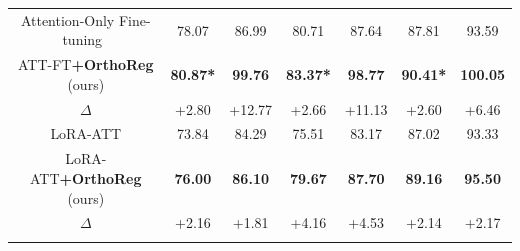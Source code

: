 \begin{table}[t]
\begin{tabular}{ccccccc}
\addlinespace[-2pt]
\midrule
Attention-Only Fine-tuning~\cite{linearatt2025} & 78.07 & 86.99 & 80.71 & 87.64 & 87.81 & 93.59 \\
ATT-FT\textbf{+OrthoReg} (ours) & {\textbf{80.87*}} & \textbf{99.76} & {\textbf{83.37*}} & \textbf{98.77} & {\textbf{90.41*}} & \textbf{100.05} \\
\rowcolor{rowblue}
\quad    $\Delta$ & {\color{darkblue}+2.80} & {\color{darkblue}+12.77} & {\color{darkblue}+2.66} & {\color{darkblue}+11.13} & {\color{darkblue}+2.60} & {\color{darkblue}+6.46} \\
\addlinespace[-2pt]
\midrule
LoRA-ATT & 73.84 & 84.29 & 75.51 & 83.17 & 87.02 & 93.33 \\
LoRA-ATT\textbf{+OrthoReg} (ours) & \textbf{76.00} & \textbf{86.10} & \textbf{79.67} & \textbf{87.70} & \textbf{89.16} & \textbf{95.50} \\
\rowcolor{rowblue}
\quad   $\Delta$ & {\color{darkblue}+2.16} & {\color{darkblue}+1.81} & {\color{darkblue}+4.16} & {\color{darkblue}+4.53} & {\color{darkblue}+2.14} & {\color{darkblue}+2.17} \\
\addlinespace[-2pt]
\bottomrule
\end{tabular}\label{tab:task_addition}
\vspace{-12pt}
\end{table}
